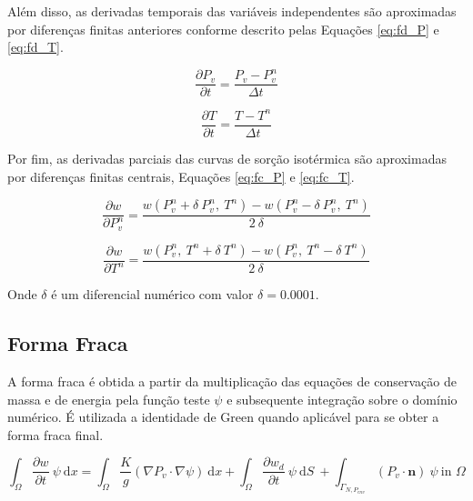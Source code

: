     Além disso, as derivadas temporais das variáveis independentes são aproximadas
    por diferenças finitas anteriores conforme descrito pelas Equações \ref{eq:fd_P} e \ref{eq:fd_T}.

    \begin{equation}
      \label{eq:fd_P}
      \frac{\partial P_v}{\partial t} = \frac{P_v - P_v^n}{\Delta t}
    \end{equation}
    
    \begin{equation}
      \label{eq:fd_T}
      \frac{\partial T}{\partial t} = \frac{T - T^n}{\Delta t}
    \end{equation}

    Por fim, as derivadas parciais das curvas de sorção isotérmica são
    aproximadas por diferenças finitas centrais, Equações \ref{eq:fc_P} e \ref{eq:fc_T}.

    \begin{equation}
      \label{eq:fc_P}
      \frac{\partial w}{\partial P_v^n} = \frac{w(P_v^n+\delta \ P_v^n, \ T^n)- w(P_v^n- \delta \ P_v^n , \ T^n)}{2 \ \delta}
    \end{equation}

    
    \begin{equation}
      \label{eq:fc_T}
      \frac{\partial w}{\partial T^n} = \frac{w(P_v^n, \ T^n+\delta \ T^n)- w(P_v^n, \ T^n- \delta \ T^n)}{2 \ \delta}
    \end{equation}

    Onde $\delta$ é um diferencial numérico com valor $\delta = 0.0001$.

    
    \subsection{Forma Fraca}\label{mat:fraca}
    A forma fraca é obtida a partir da multiplicação das equações de conservação
    de massa e de energia pela função teste $\psi$ e subsequente integração
    sobre o domínio numérico. É utilizada a identidade de Green quando aplicável
    para se obter a forma fraca final.

  \begin{equation}
     \label{eq:weak_MB}
  \int_{\Omega}  \frac{\partial w}{\partial t} \ \psi \ \text{d}x =   \int_{\Omega}    \frac{K}{g} \left(  \nabla P_v \cdot \nabla  \psi \right) \ \text{d}x +   \int_{\Omega}    \frac{\partial w_d}{\partial t}  \ \psi \ \text{d}S \ +   \int_{\Gamma_{N, P_{env}}} \left( P_v \cdot \mathbf{n} \right) \ \psi \ \text{in } \Omega
   \end{equation}

